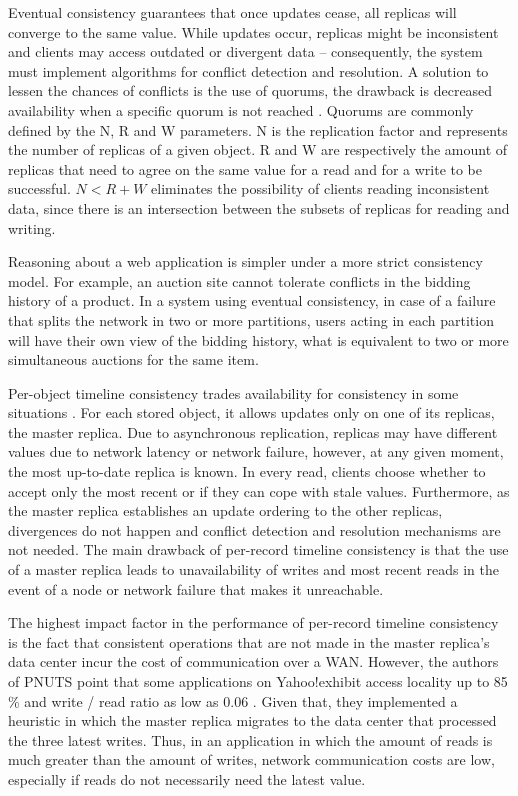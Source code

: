 \documentclass[doublespacing]{bmcart}
\begin{document}
Eventual consistency guarantees that once updates cease, all replicas will converge to the same value. While updates occur, replicas might be
inconsistent and clients may access outdated or divergent data -- consequently,
the system must implement algorithms for conflict detection and resolution. A
solution to lessen the chances of conflicts is the use of quorums, the
drawback is decreased availability when a specific quorum is not reached
\cite{Vogels2009}. Quorums are commonly defined by the N, R and W parameters. N is
the replication factor and represents the number of replicas of a given object.
R and W are respectively the amount of replicas that need to agree on the same value for a
read and for a write to be successful. $N < R + W$ eliminates the possibility of
clients reading inconsistent data, since there is an intersection between the
subsets of replicas for reading and writing.

Reasoning about a web application is simpler under a more strict consistency model. For
example, an auction site cannot tolerate conflicts in the bidding history of a
product. In a system using eventual consistency, in case of a failure that
splits the network in two or more partitions, users acting in each partition will have their
own view of the bidding history, what is equivalent to two or more simultaneous auctions
for the same item.

Per-object timeline consistency trades availability for consistency in some situations \cite{Cooper2008}. For each stored object, it allows updates only on one of its
replicas, the master replica. Due to asynchronous replication, replicas may have
different values due to network latency or network failure, however, at any given moment,
the most up-to-date replica is known. In every read, clients choose whether to
accept only the most recent or if they can cope with stale values. Furthermore, as the master replica
establishes an update ordering to the other replicas, divergences do
not happen and conflict detection and resolution mechanisms are not needed. The
main drawback of per-record timeline consistency is that the use of a master replica
leads to unavailability of writes and most recent reads in the event of a node or network failure
that makes it unreachable.

The highest impact factor in the performance of per-record timeline consistency is the fact
that consistent operations that are not made in the master replica's data center
incur the cost of communication over a WAN.  However, the authors of PNUTS
point that some applications on Yahoo!exhibit access locality up to 85
\% and write / read ratio as low as 0.06 \cite{Kadambi2011, Cooper2008}. Given
that, they implemented a heuristic in which the master replica migrates to the
data center that processed the three latest writes. Thus, in an application in which
the amount of reads is much greater than the amount of writes, network
communication costs are low, especially if reads do not necessarily need the
latest value.
\end{document}

